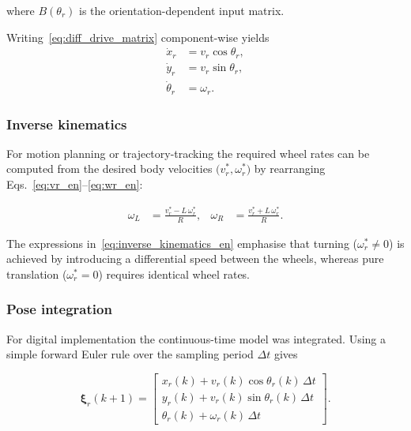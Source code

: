 \noindent
where \(B(\theta_r)\) is the orientation-dependent input matrix.

Writing~\eqref{eq:diff_drive_matrix} component-wise yields
\begin{subequations}\label{eq:diff_drive_ode_en}
\begin{align}
    \dot{x}_r &= v_r\cos\theta_r, \\
    \dot{y}_r &= v_r\sin\theta_r, \\
    \dot{\theta}_r &= \omega_r.
\end{align}
\end{subequations}

\subsubsection{Inverse kinematics}
For motion planning or trajectory-tracking the required wheel rates can be
computed from the desired body velocities
\(\bigl(v_r^\ast,\omega_r^\ast\bigr)\) by rearranging
Eqs.~\eqref{eq:vr_en}–\eqref{eq:wr_en}:

\begin{align}
    \omega_L &= \frac{v_r^\ast - L\,\omega_r^\ast}{R}, &
    \omega_R &= \frac{v_r^\ast + L\,\omega_r^\ast}{R}.
    \label{eq:inverse_kinematics_en}
\end{align}

\noindent
The expressions in~\eqref{eq:inverse_kinematics_en} emphasise that turning
(\(\omega_r^\ast \neq 0\)) is achieved by introducing a differential speed
between the wheels, whereas pure translation
(\(\omega_r^\ast = 0\)) requires identical wheel rates.

\subsubsection{Pose integration}
For digital implementation the continuous-time model was integrated.
Using a simple forward Euler rule over the sampling period \(\Delta t\)
gives

\begin{equation}
    \boldsymbol{\xi}_r(k+1)=
    \begin{bmatrix}
        x_r(k) + v_r(k)\cos\theta_r(k)\,\Delta t \\
        y_r(k) + v_r(k)\sin\theta_r(k)\,\Delta t \\
        \theta_r(k) + \omega_r(k)\,\Delta t
    \end{bmatrix}.
    \label{eq:euler_update}
\end{equation}


